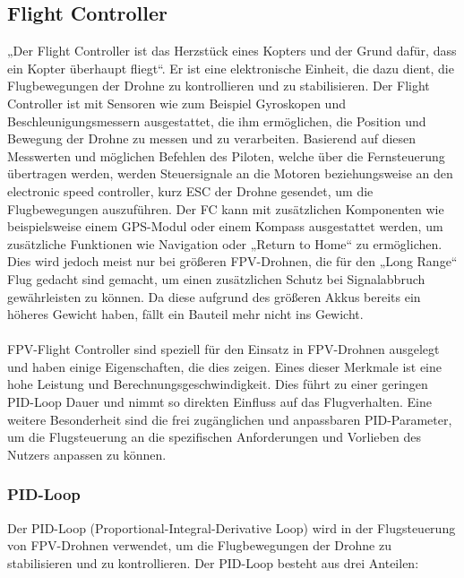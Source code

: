     \subsection[Flight Controller]{Flight Controller}
        „Der Flight Controller ist das Herzstück eines Kopters und der Grund dafür, dass ein Kopter überhaupt fliegt“. Er ist eine elektronische Einheit, die dazu dient, die Flugbewegungen der Drohne zu kontrollieren und zu stabilisieren. Der Flight Controller ist mit Sensoren wie zum Beispiel Gyroskopen und Beschleunigungsmessern ausgestattet, die ihm ermöglichen, die Position und Bewegung der Drohne zu messen und zu verarbeiten. Basierend auf diesen Messwerten und möglichen Befehlen des Piloten, welche über die Fernsteuerung übertragen werden, werden Steuersignale an die Motoren beziehungsweise an den electronic speed controller, kurz ESC der Drohne gesendet, um die Flugbewegungen auszuführen. Der FC kann mit zusätzlichen Komponenten wie beispielsweise einem GPS-Modul oder einem Kompass ausgestattet werden, um zusätzliche Funktionen wie Navigation oder „Return to Home“ zu ermöglichen. Dies wird jedoch meist nur bei größeren FPV-Drohnen, die für den „Long Range“ Flug gedacht sind gemacht, um einen zusätzlichen Schutz bei Signalabbruch gewährleisten zu können. Da diese aufgrund des größeren Akkus bereits ein höheres Gewicht haben, fällt ein Bauteil mehr nicht ins Gewicht.
        \\ \\
        FPV-Flight Controller sind speziell für den Einsatz in FPV-Drohnen ausgelegt und haben einige Eigenschaften, die dies zeigen. Eines dieser Merkmale ist eine hohe Leistung und Berechnungsgeschwindigkeit. Dies führt zu einer geringen PID-Loop Dauer und nimmt so direkten Einfluss auf das Flugverhalten. Eine weitere Besonderheit sind die frei zugänglichen und anpassbaren PID-Parameter, um die Flugsteuerung an die spezifischen Anforderungen und Vorlieben des Nutzers anpassen zu können.
    
        \subsubsection[PID-Loop]{PID-Loop}
            Der PID-Loop (Proportional-Integral-Derivative Loop) wird in der Flugsteuerung von FPV-Drohnen verwendet, um die Flugbewegungen der Drohne zu stabilisieren und zu kontrollieren. Der PID-Loop besteht aus drei Anteilen:

